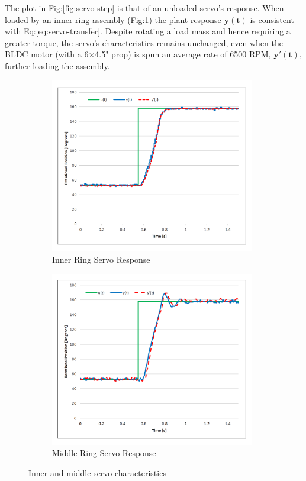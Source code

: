 \par
The plot in Fig:\ref{fig:servo-step} is that of an unloaded servo's response. When loaded by an inner ring assembly (Fig:\ref{fig:servo-step-inner}) the plant response {\color{Blue}$\mathbf{y(t)}$} is consistent with Eq:\ref{eq:servo-transfer}. Despite rotating a load mass and hence requiring a greater torque, the servo's characteristics remains unchanged, even when the BLDC motor (with a 6$\times$4.5" prop) is spun an average rate of 6500 RPM, {\color{Red}$\mathbf{y'(t)}$}, further loading the assembly.
\begin{figure}[hbtp]
\begin{subfigure}{0.5\textwidth}
\centering
\includegraphics[width=0.98\textwidth]{graphs/servo-step-inner}
\caption{Inner Ring Servo Response}
\label{fig:servo-step-inner}
\end{subfigure}
\begin{subfigure}{0.5\textwidth}
\centering
\includegraphics[width=0.98\textwidth]{graphs/servo-step-middle}
\caption{Middle Ring Servo Response}
\label{fig:servo-step-middle}
\end{subfigure}
\caption{Inner and middle servo characteristics}
\end{figure}
